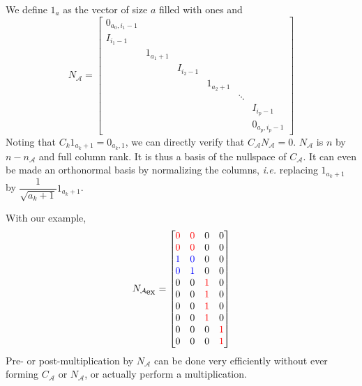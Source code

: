 \documentclass[]{article}
\newcommand{\BIN}{\begin{bmatrix}}
\newcommand{\BOUT}{\end{bmatrix}}
\newcommand{\cred}[1]{\textcolor{red}{#1}}
\newcommand{\cblue}[1]{\textcolor{blue}{#1}}
\begin{document}
We define $1_a$ as the vector of size $a$ filled with ones and
\begin{equation}
  N_{\mathcal{A}} = \BIN 
    0_{a_0,i_1-1} & & & & & \\
    I_{i_1-1} & & & & & \\
    & 1_{a_1+1} & & & & \\
    && I_{i_2-1} & & & \\
    &&& 1_{a_2+1} & & \\
    &&&&\ddots & \\
    &&&&& I_{i_p-1} \\
    &&&&& 0_{a_p,i_p-1}
  \BOUT
\end{equation}
Noting that $C_k 1_{a_k+1} = 0_{a_k,1}$, we can directly verify that $C_{\mathcal{A}} N_{\mathcal{A}} = 0$. $N_{\mathcal{A}}$ is $n$ by $n-n_{\mathcal{A}}$ and full column rank. It is thus a basis of the nullspace of $C_{\mathcal{A}}$. It can even be made an orthonormal basis by normalizing the columns, \emph{i.e.} replacing $1_{a_k+1}$ by $\dfrac{1}{\sqrt{a_k+1}}1_{a_k+1}$.

With our example,
\begin{equation}
N_{\mathcal{A}_{\mbox{\small ex}}} = \BIN              
  \cred{0} & \cred{0} & 0 & 0 \\
  \cred{0} & \cred{0} & 0 & 0 \\
  \cblue{1} & \cblue{0} & 0 & 0 \\
  \cblue{0} & \cblue{1} & 0 & 0 \\
  0 & 0 & \cred{1} & 0 \\
  0 & 0 & \cred{1} & 0 \\
  0 & 0 & \cred{1} & 0 \\
  0 & 0 & \cred{1} & 0 \\
  0 & 0 & 0 & \cred{1} \\
  0 & 0 & 0 & \cred{1} \\
\BOUT
\end{equation}
Pre- or post-multiplication by $N_{\mathcal{A}}$ can be done very efficiently without ever forming $C_{\mathcal{A}}$ or $N_{\mathcal{A}}$, or actually perform a multiplication.
\end{document}
